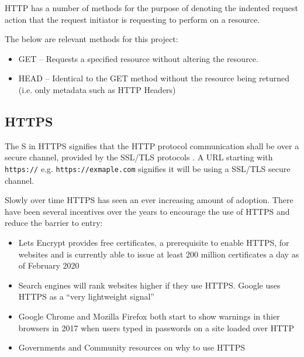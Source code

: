 \documentclass{mscreport}
\begin{document}
\noindent HTTP has a number of methods for the purpose of denoting the indented request action that the request initiator is requesting to perform on a resource.

\vspace{0.3cm} \noindent
The below are relevant methods for this project:
\begin{itemize}
	\setlength\itemsep{0.1em}
	\item GET – Requests a specified resource without altering the resource.
	\item HEAD – Identical to the GET method without the resource being returned (i.e. only metadata such as HTTP Headers)
\end{itemize}

\subsection{HTTPS}

\noindent The S in HTTPS signifies that the HTTP protocol communication shall be over a secure channel, provided by the SSL/TLS protocols \cite{Rescorla2000-fs}. A URL starting with \texttt{https://} e.g. \texttt{https://exmaple.com} signifies it will be using a SSL/TLS secure channel.

\vspace{0.3cm}
\noindent Slowly over time HTTPS has seen an ever increasing amount of adoption. There have been several incentives over the years to encourage the use of HTTPS and reduce the barrier to entry:

\begin{itemize}
	\setlength\itemsep{0.1em}
	\item Lets Encrypt provides free certificates, a prerequisite to enable HTTPS, for websites and is currently able to issue at least 200 million certificates a day as of February 2020 \cite{noauthor_undated-bi}
	\item Search engines will rank websites higher if they use HTTPS. Google uses HTTPS as a ``very lightweight signal'' \cite{noauthor_undated-im}
	\item Google Chrome and Mozilla Firefox both start to show warnings in thier browsers in 2017 when users typed in passwords on a site loaded over HTTP \cite{Vyas2017-ds,Google_undated-ws}
	\item Governments and Community resources on why to use HTTPS \cite{noauthor_undated-oz,noauthor_undated-xk}
\end{itemize}
\end{document}
